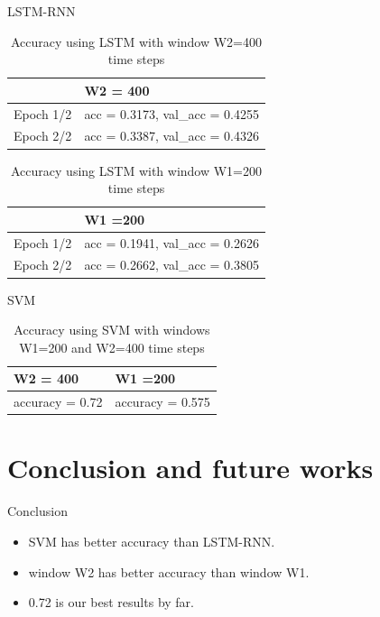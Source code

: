 \documentclass[xcolor=dvipsnames]{beamer} %
\begin{document}
	\begin{frame}{LSTM-RNN}
	    \begin{table}[]
            \begin{tabular}{|l|l|}
            \hline
                      & W2 = 400                        \\ \hline
            Epoch 1/2 & acc = 0.3173, val\_acc = 0.4255 \\ \hline
            Epoch 2/2 & acc = 0.3387, val\_acc = 0.4326 \\ \hline
            \end{tabular}
            \caption{Accuracy using LSTM with window W2=400 time steps}
        \end{table}
        
        \begin{table}[]
            \begin{tabular}{|l|l|}
            \hline
                      & W1 =200                        \\ \hline
            Epoch 1/2 & acc = 0.1941, val\_acc = 0.2626 \\ \hline
            Epoch 2/2 & acc = 0.2662, val\_acc = 0.3805 \\ \hline
            \end{tabular}
            \caption{Accuracy using LSTM with window W1=200 time steps}
        \end{table}
	\end{frame}
	
	\begin{frame}{SVM}
	    \begin{table}[h]
            \centering
            \begin{tabular}{|l|l|}
            \hline
            W2 = 400        & W1 =200          \\ \hline
            accuracy = 0.72 & accuracy = 0.575 \\ \hline
            \end{tabular}
            \caption{Accuracy using SVM with windows W1=200 and W2=400 time steps}
            \label{table:SVM}
        \end{table}
	\end{frame}

	\section{Conclusion and future works}
	
	\begin{frame}{Conclusion}
	    \begin{itemize}
	        \item SVM has better accuracy than LSTM-RNN.
	        \item window W2 has better accuracy than window W1.
	        \item 0.72 is our best results by far.
	    \end{itemize}
	\end{frame}
	
\end{document}
